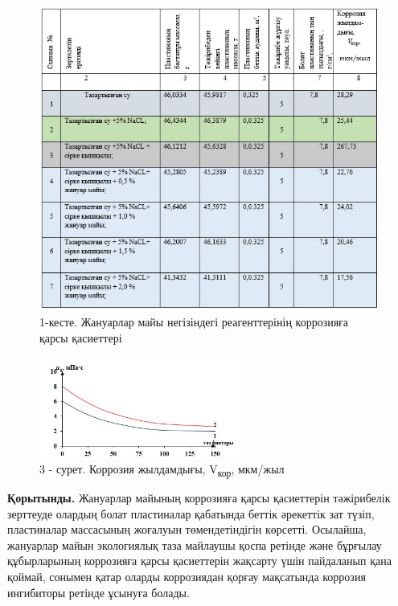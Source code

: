 \begin{figure}[H]
	\caption*{ 1-кесте. Жануарлар майы негізіндегі реагенттерінің коррозияға
	қарсы қасиеттері}
	\centering
	\includegraphics[width=\textwidth]{media/gor/image24.2}
	
\end{figure}



\begin{figure}[H]
	\centering
	\includegraphics[width=0.6\textwidth]{media/gor/image23.3}
	\caption*{3 - сурет. Коррозия жылдамдығы, V\textsubscript{кор}, мкм/жыл }
\end{figure}

\begin{multicols}{2}



{\bfseries Қорытынды.} Жануарлар майының коррозияға қарсы қасиеттерін
тәжірибелік зерттеуде олардың болат пластиналар қабатында беттік
әрекеттік зат түзіп, пластиналар массасының жоғалуын төмендетіндігін
көрсетті. Осылайша, жануарлар майын экологиялық таза майлаушы қоспа
ретінде және бұрғылау құбырларының коррозияға қарсы қасиеттерін жақсарту
үшін пайдаланып қана қоймай, сонымен қатар оларды коррозиядан қорғау
мақсатында коррозия ингибиторы ретінде ұсынуға болады.
\end{multicols}


